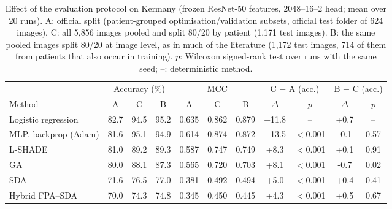 \begin{table}[!t]
\centering
\caption{Effect of the evaluation protocol on Kermany (frozen ResNet-50 features, 2048--16--2 head; mean over 20 runs). A: official split (patient-grouped optimisation/validation subsets, official test folder of 624 images). C: all 5,856 images pooled and split 80/20 by patient (1,171 test images). B: the same pooled images split 80/20 at image level, as in much of the literature (1,172 test images, 714 of them from patients that also occur in training). $p$: Wilcoxon signed-rank test over runs with the same seed; --: deterministic method.}
\label{tab:split}
\footnotesize
\setlength{\tabcolsep}{3pt}
\begin{tabular}{lcccccccccc}
\toprule
 & \multicolumn{3}{c}{Accuracy (\%)} & \multicolumn{3}{c}{MCC} & \multicolumn{2}{c}{C $-$ A (acc.)} & \multicolumn{2}{c}{B $-$ C (acc.)} \\
Method & A & C & B & A & C & B & $\Delta$ & $p$ & $\Delta$ & $p$ \\
\midrule
Logistic regression & 82.7 & 94.5 & 95.2 & 0.635 & 0.862 & 0.879 & +11.8 & -- & +0.7 & -- \\
MLP, backprop (Adam) & 81.6 & 95.1 & 94.9 & 0.614 & 0.874 & 0.872 & +13.5 & $<$0.001 & -0.1 & 0.57 \\
L-SHADE & 81.0 & 89.2 & 89.3 & 0.587 & 0.747 & 0.749 & +8.3 & $<$0.001 & +0.1 & 0.91 \\
GA & 80.0 & 88.1 & 87.3 & 0.565 & 0.720 & 0.703 & +8.1 & $<$0.001 & -0.7 & 0.02 \\
SDA & 71.6 & 76.5 & 77.0 & 0.381 & 0.492 & 0.494 & +5.0 & $<$0.001 & +0.4 & 0.41 \\
Hybrid FPA--SDA & 70.0 & 74.3 & 74.8 & 0.345 & 0.450 & 0.445 & +4.3 & $<$0.001 & +0.5 & 0.67 \\
\bottomrule
\end{tabular}
\end{table}
